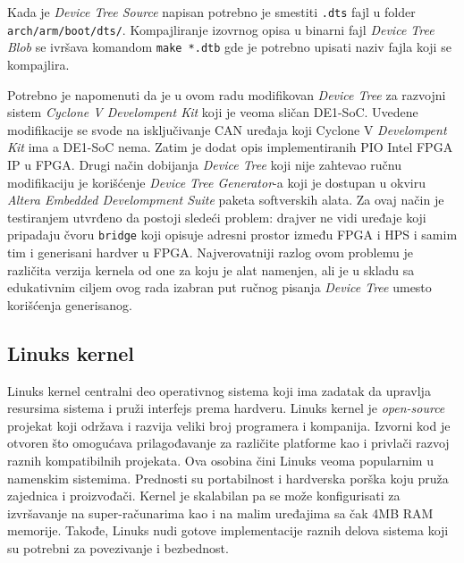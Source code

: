 Kada je \textit{Device Tree Source} napisan potrebno je smestiti \texttt{.dts} fajl u folder \texttt{arch/arm/boot/dts/}. Kompajliranje izovrnog opisa u binarni fajl \textit{Device Tree Blob} se ivršava komandom \texttt{make *.dtb} gde je potrebno upisati naziv fajla koji se kompajlira.

Potrebno je napomenuti da je u ovom radu modifikovan \textit{Device Tree} za razvojni sistem \textit{Cyclone V Develompent Kit} koji je veoma sličan DE1-SoC. Uvedene modifikacije se svode na isključivanje CAN uređaja koji Cyclone V \textit{Develompent Kit} ima a DE1-SoC nema. Zatim je dodat opis implementiranih PIO Intel FPGA IP u FPGA. Drugi način dobijanja \textit{Device Tree} koji nije zahtevao ručnu modifikaciju je korišćenje \textit{Device Tree Generator}-a koji je dostupan u okviru \textit{Altera Embedded Develompment Suite} paketa softverskih alata. Za ovaj način je testiranjem utvrđeno da postoji sledeći problem: drajver ne vidi uređaje koji pripadaju čvoru \texttt{bridge} koji opisuje adresni prostor između FPGA i HPS i samim tim i generisani hardver u FPGA. Najverovatniji razlog ovom problemu je različita verzija kernela od one za koju je alat namenjen, ali je u skladu sa edukativnim ciljem ovog rada izabran put ručnog pisanja \textit{Device Tree} umesto korišćenja generisanog.

\subsection{Linuks kernel}
Linuks kernel centralni deo operativnog sistema koji ima zadatak da upravlja resursima sistema i pruži interfejs prema hardveru. Linuks kernel je \textit{open-source} projekat koji održava i razvija veliki broj programera i kompanija. Izvorni kod je otvoren što omogućava prilagođavanje za različite platforme kao i privlači razvoj raznih kompatibilnih projekata. Ova osobina čini Linuks veoma popularnim u namenskim sistemima. Prednosti su portabilnost i hardverska porška koju pruža zajednica i proizvođači. Kernel je skalabilan pa se može konfigurisati za izvršavanje na super-računarima kao i na malim uređajima sa čak 4MB RAM memorije. Takođe, Linuks nudi gotove implementacije raznih delova sistema koji su potrebni za povezivanje i bezbednost.

